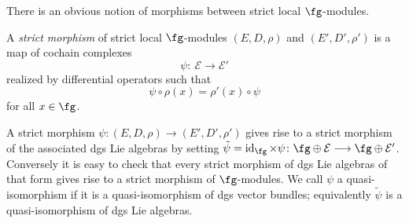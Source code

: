 \documentclass[10pt,a4paper]{amsart}
\numberwithin{equation}{section}
\def\cE{\mathcal E}\def\cF{\mathcal F}\def\cG{\mathcal G}\def\cH{\mathcal H}
\DeclareMathOperator{\id}{id}
\begin{document}
There is an obvious notion of morphisms between strict local $\fg$-modules.
\begin{dfn}
	A \emph{strict morphism} of strict local $\fg$-modules	$(E,D,\rho)$ and $(E',D',\rho')$ is a map of cochain complexes
	\begin{equation*}
	\psi \colon \ \cE \longrightarrow \cE'
	\end{equation*}
	realized by differential operators such that
	\begin{equation*}
	\psi \circ \rho(x) = \rho'(x) \circ \psi
	\end{equation*}
	for all $x \in \fg$.
\end{dfn}
A strict morphism $\psi \colon (E,D,\rho) \longrightarrow (E',D',\rho')$ gives rise to a strict morphism of the associated dgs Lie algebras by setting $\tilde{\psi} = \id_{\fg} \times \psi \colon \fg \oplus \cE \longrightarrow \fg \oplus \cE'$. Conversely it is easy to check that every strict morphism of dgs Lie algebras of that form gives rise to a strict morphism of $\fg$-modules. We call $\psi$ a quasi-isomorphism if it is a quasi-isomorphism of dgs vector bundles; equivalently $\tilde{\psi}$ is a quasi-isomorphism of dgs Lie algebras.
\end{document}
